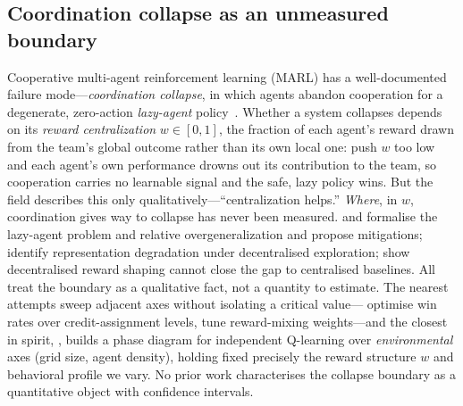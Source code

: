 \documentclass[letterpaper]{article}
\theoremstyle{plain}
\begin{document}
\subsection{Coordination collapse as an unmeasured boundary}
Cooperative multi-agent reinforcement learning (MARL) has a well-documented
failure mode---\emph{coordination collapse}, in which agents abandon cooperation
for a degenerate, zero-action \emph{lazy-agent}
policy~\citep{liu2023lazy,peng2023curo}. Whether a system collapses depends on
its \emph{reward centralization} $w\in[0,1]$, the fraction of each agent's reward
drawn from the team's global outcome rather than its own local one: push $w$ too
low and each agent's own performance drowns out its contribution to the team, so
cooperation carries no learnable signal and the safe, lazy policy wins. But the
field describes this only qualitatively---``centralization helps.'' \emph{Where},
in $w$, coordination gives way to collapse has never been measured.
\citet{liu2023lazy} and \citet{peng2023curo} formalise the lazy-agent problem and
relative overgeneralization and propose mitigations; \citet{weng2026} identify
representation degradation under decentralised exploration; \citet{dmarl2025}
show decentralised reward shaping cannot close the gap to centralised baselines.
All treat the boundary as a qualitative fact, not a quantity to estimate. The
nearest attempts sweep adjacent axes without isolating a critical
value---\citet{wang2025maca} optimise win rates over credit-assignment levels,
\citet{jiang2018dgn} tune reward-mixing weights---and the closest in spirit,
\citet{yamaguchi2025}, builds a phase diagram for independent Q-learning over
\emph{environmental} axes (grid size, agent density), holding fixed precisely the
reward structure $w$ and behavioral profile we vary. No prior work characterises
the collapse boundary as a quantitative object with confidence intervals.

\end{document}
